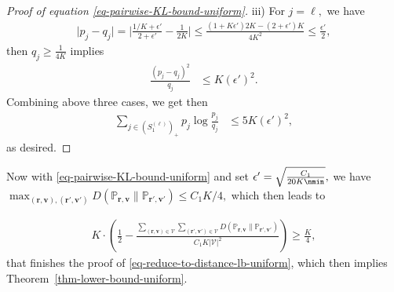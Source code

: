 \documentclass[10pt, letterpaper]{article}
\begin{document}
\begin{proof}[Proof of equation \eqref{eq-pairwise-KL-bound-uniform}]
\noindent iii) For $j = \ell,$ we have \begin{align*}
    \lvert p_j - q_j \rvert = \Big| \frac{1/K+{\epsilon'}}{2 + {\epsilon'}} - \frac{1}{2K}\Big| \leq  \frac{(1+K{\epsilon'})2K - (2+{\epsilon'})K }{4K^2} \leq \frac{{\epsilon'}}{2},
\end{align*}
then $q_j \geq \frac{1}{4K}$ implies \begin{align*}
\frac{(p_j - q_j)^2}{q_j} & \leq  K(\epsilon')^2.
\end{align*}
Combining above three cases, we get then \begin{align*}
\sum_{j\in (S^{(\ell)}_1)_+} p_j \log \frac{p_j}{q_j} & \leq 5K(\epsilon')^2,
\end{align*}
as desired.
\end{proof}

Now with \eqref{eq-pairwise-KL-bound-uniform} and set $\epsilon' =\sqrt{\frac{C_1}{20 K\nmin}},$ we have $\max_{(\bm r, \bm v),(\bm r', \bm v')} D(\mathbb{P}_{\bm r, \bm v} \lVert \mathbb{P}_{\bm r', \bm v'})\leq C_1K/4,$ which then leads to

\begin{align*}
    K\cdot \left(\frac{1}{2} - \frac{\sum_{(\bm r, \bm v)\in \mathcal{V}}\sum_{(\bm r', \bm v')\in \mathcal{V}} D(\mathbb{P}_{\bm r, \bm v} \lVert \mathbb{P}_{\bm r', \bm v'}) }{C_1K\lvert \mathcal V \rvert^2} \right) \geq \frac{K}{4},
\end{align*}
that finishes the proof of \eqref{eq-reduce-to-distance-lb-uniform}, which then implies Theorem~\ref{thm-lower-bound-uniform}.
\end{document}
